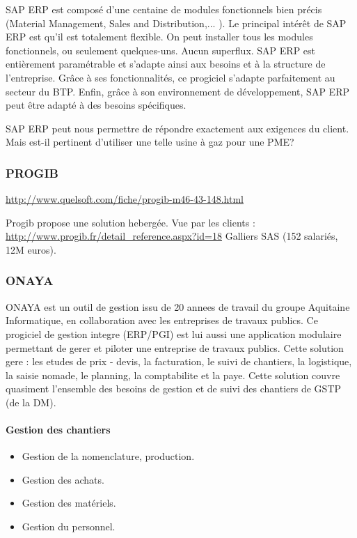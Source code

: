 				SAP ERP est composé d'une centaine de modules fonctionnels bien précis (Material Management, Sales and Distribution,... ). 
Le principal intérêt de SAP ERP est qu'il est totalement flexible. On peut installer tous les modules fonctionnels, ou seulement quelques-uns. 
Aucun superflux. SAP ERP est entièrement paramétrable et s'adapte ainsi aux besoins et à la structure de l'entreprise. 
Grâce à ses fonctionnalités, ce progiciel s'adapte parfaitement au secteur du BTP. 
Enfin, grâce à son environnement de développement, SAP ERP peut être adapté à des besoins spécifiques.

SAP ERP peut nous permettre de répondre exactement aux exigences du client. Mais est-il pertinent d'utiliser une telle usine à gaz pour une PME?  

		\subsubsection{PROGIB}
				\url{http://www.quelsoft.com/fiche/progib-m46-43-148.html}
				 
				Progib propose une solution hebergée.
				Vue par les clients :
				\url{http://www.progib.fr/detail_reference.aspx?id=18}
				Galliers SAS (152 salariés, 12M euros).

		\subsubsection{ONAYA}
		ONAYA est un outil de gestion issu de 20 annees de travail du groupe Aquitaine Informatique, en collaboration avec les entreprises de travaux publics. Ce progiciel de gestion integre (ERP/PGI) est lui aussi une application modulaire permettant de gerer et piloter une entreprise de travaux publics. Cette solution gere : les etudes de prix - devis, la facturation, le suivi de chantiers, la
logistique, la saisie nomade, le planning, la comptabilite et la paye. Cette solution couvre quasiment l'ensemble des besoins de gestion et de suivi des chantiers de GSTP (de la DM).

				\paragraph{Gestion des chantiers}
				\begin{itemize}
				    \item Gestion de la nomenclature, production.
				    \item Gestion des achats.
				    \item Gestion des matériels.
				    \item Gestion du personnel.
				\end{itemize}
				
